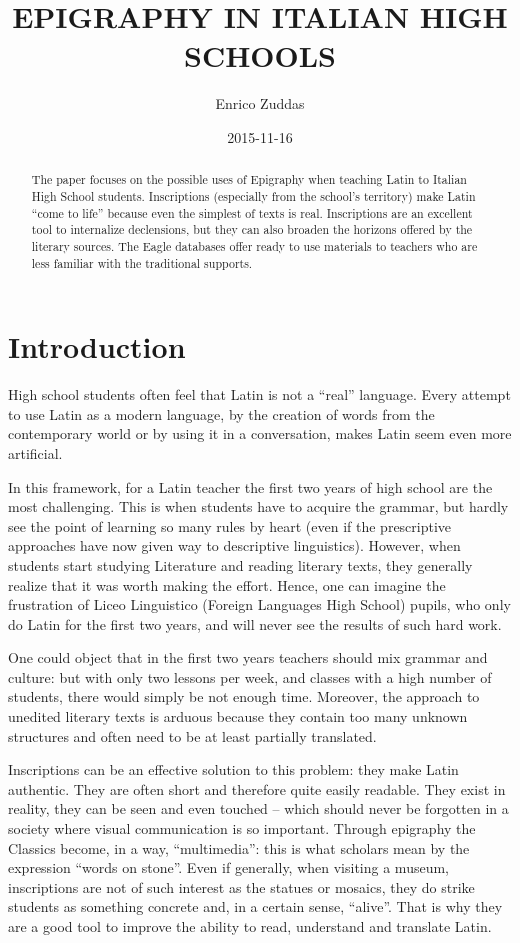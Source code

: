 \documentclass[amsthm,ebook]{saparticle}
\title{EPIGRAPHY IN ITALIAN HIGH SCHOOLS}
\author[up]{Enrico Zuddas\corref{first}}
\date{2015-11-16}
\begin{document}
\maketitle
\begin{abstract}
The paper focuses on the possible uses of Epigraphy when teaching Latin to Italian High School students. Inscriptions
(especially from the school’s territory) make Latin ``come to life'' because even the simplest of texts is real.
Inscriptions are an excellent tool to internalize declensions, but they can also broaden the horizons offered by the
literary sources. The Eagle databases offer ready to use materials to teachers who are less familiar with the
traditional supports.
\end{abstract}




\section{Introduction}
\noindent High school students often feel that Latin is not a ``real'' language. Every attempt to use Latin as a modern language, by
the creation of words from the contemporary world or by using it in a conversation, makes Latin seem even more
artificial.

In this framework, for a Latin teacher the first two years of high school are the most challenging. This is when
students have to acquire the grammar, but hardly see the point of learning so many rules by heart (even if the
prescriptive approaches have now given way to descriptive linguistics). However, when students start studying
Literature and reading literary texts, they generally realize that it was worth making the effort. Hence, one can
imagine the frustration of Liceo Linguistico (Foreign Languages High School) pupils, who only do Latin for the first
two years, and will never see the results of such hard work.

One could object that in the first two years teachers should mix grammar and culture: but with only two lessons per
week, and classes with a high number of students, there would simply be not enough time. Moreover, the approach to
unedited literary texts is arduous because they contain too many unknown structures and often need to be at least
partially translated.

Inscriptions can be an effective solution to this problem: they make Latin authentic. They are often short and therefore
quite easily readable. They exist in reality, they can be seen and even touched – which should never be forgotten in a
society where visual communication is so important. Through epigraphy the Classics become, in a way, ``multimedia'': this
is what scholars mean by the expression ``words on stone''. Even if generally, when visiting a museum, inscriptions are
not of such interest as the statues or mosaics, they do strike students as something concrete and, in a certain sense,
``alive''. That is why they are a good tool to improve the ability to read, understand and translate Latin.
\end{document}
